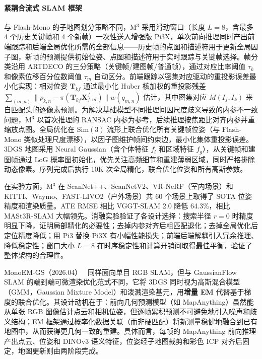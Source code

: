 \paragraph{紧耦合流式 SLAM 框架}与 Flash-Mono 的子地图划分策略不同，M$^3$ 采用滑动窗口（长度 $L=8$，含最多 4 个历史关键帧和 4 个新帧）一次性送入增强版 Pi3X，单次前向推理同时产出前端跟踪和后端全局优化所需的全部信息——历史帧的点图和描述符用于更新全局因子图，新帧的预测提供初始位姿、点图和描述符用于实时跟踪与关键帧选择。帧分类沿用 ARTDECO 的三分策略（关键帧/建图帧/普通帧），通过对应比率阈值 $\tau_k$ 和像素位移百分位数阈值 $\tau_m$ 自动区分。前端跟踪以密集对应驱动的重投影误差最小化实现：相对位姿 $\mathbf{T}_{kf}$ 通过最小化 Huber 核加权的重投影残差 $\sum_{(m,n)} \|p_{k,n} - \pi(\mathbf{T}_{kf}\mathbf{X}^f_{f,m})\|w(q_{m,n})$ 估计，其中密集对应 $M(I_f, I_k)$ 来自匹配头的逐像素预测。为解决基础模型不同推理间因尺度歧义导致的内参不一致问题，M$^3$ 以首次推理的 RANSAC 内参为参考，后续推理按焦距比对齐内参并重缩放点图。全局优化在 $\mathrm{Sim}(3)$ 流形上联合优化所有关键帧位姿（与 Flash-Mono 类似处理尺度漂移），以因子图维护帧间约束边，最小化集体重投影误差。3DGS 地图采用 Neural Gaussian（含个体特征 $f_l$ 和区域特征 $f_g$），从关键帧和建图帧通过 LoG 概率图初始化，优先关注高频细节和重建薄弱区域，同时严格排除动态像素。序列完成后执行 10K 次全局精化，联合优化位姿和所有高斯参数。

在实验方面，M$^3$ 在 ScanNet++、ScanNetV2、VR-NeRF（室内场景）和 KITTI、Waymo、FAST-LIVO2（户外场景）共 60 个场景上取得了 SOTA 位姿精度和渲染质量。ATE RMSE 相比 VGGT-SLAM 2.0 降低 64.3\%，相比 MASt3R-SLAM 大幅领先。消融实验验证了各设计选择：搜索半径 $r=0$ 时精度明显下降，证明局部精化的必要性；去掉内参对齐后粗匹配退化；去掉全局优化后定位精度降低；用 Pi3 替换 Pi3X 有小幅性能损失；前端后端解耦引入冗余推理、降低稳定性；窗口大小 $L=8$ 在时序稳定性和计算开销间取得最佳平衡，验证了整体架构的合理性。

MonoEM-GS（2026.04）~\cite{2604_10593} 同样面向单目 RGB SLAM，但与 GaussianFlow SLAM 的端到端可微渲染优化范式不同，它将 3DGS 同时视为高斯混合模型（GMM，Gaussian Mixture Model）和泼溅渲染基元，用\textbf{增量 EM} 代替基于梯度的联合优化。其设计动机在于：前向几何预测模型（如 MapAnything）虽然能从单张 RGB 图像估计点云和相机位姿，但逐帧累积预测不可避免地引入噪声和歧义结构；EM 框架通过概率化数据关联（而非硬匹配）将新测量稳健地融合到已有地图中，从而获得更几何一致的重建。具体而言，每帧的 MapAnything 前向推理产出点云、位姿和 DINOv3 语义特征，位姿经子地图裁剪和彩色 ICP 对齐后固定，地图更新则由两阶段完成。

